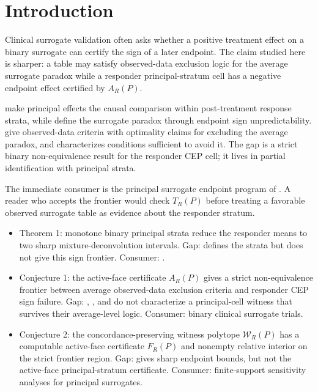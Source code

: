 \documentclass[11pt]{article}
\theoremstyle{definition}
\theoremstyle{plain}
\theoremstyle{remark}
\begin{document}
\section{Introduction}
Clinical surrogate validation often asks whether a positive treatment effect on a binary surrogate can certify the sign of a later endpoint. The claim studied here is sharper: a table may satisfy observed-data exclusion logic for the average surrogate paradox while a responder principal-stratum cell has a negative endpoint effect certified by \(A_R(P)\).

\citet[Sec.~2]{FrangakisRubin2002} make principal effects the causal comparison within post-treatment response strata, while \citet[p.~920, Summary]{ChenGengJia2007} define the surrogate paradox through endpoint sign unpredictability. \citet[Sec.~3, Theorems~1--2]{YinLiuGengLuo2019} give observed-data criteria with optimality claims for excluding the average paradox, and \citet[Sec.~3]{VanderWeele2013} characterizes conditions sufficient to avoid it. The gap is a strict binary non-equivalence result for the responder CEP cell; it lives in partial identification with principal strata.

The immediate consumer is the principal surrogate endpoint program of \citet{GilbertHudgens2008}. A reader who accepts the frontier would check \(T_R(P)\) before treating a favorable observed surrogate table as evidence about the responder stratum.

\begin{itemize}[leftmargin=*]
\item Theorem 1: monotone binary principal strata reduce the responder means to two sharp mixture-deconvolution intervals. Gap: \citet{FrangakisRubin2002} defines the strata but does not give this sign frontier. Consumer: \citet{GilbertHudgens2008}.
\item Conjecture 1: the active-face certificate \(A_R(P)\) gives a strict non-equivalence frontier between average observed-data exclusion criteria and responder CEP sign failure. Gap: \citet[p.~920]{ChenGengJia2007}, \citet[Sec.~3]{VanderWeele2013}, and \citet[Sec.~3, Theorems~1--2]{YinLiuGengLuo2019} do not characterize a principal-cell witness that survives their average-level logic. Consumer: binary clinical surrogate trials.
\item Conjecture 2: the concordance-preserving witness polytope \(\mathcal W_R(P)\) has a computable active-face certificate \(F_R(P)\) and nonempty relative interior on the strict frontier region. Gap: \citet[Sec.~3]{Kuroki2013} gives sharp endpoint bounds, but not the active-face principal-stratum certificate. Consumer: finite-support sensitivity analyses for principal surrogates.
\end{itemize}
\end{document}
